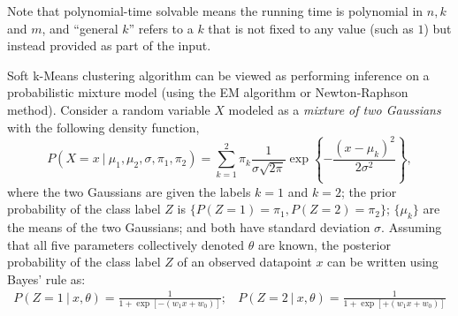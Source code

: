 \documentclass[solution,addpoints,12pt]{exam}
\begin{document}
\begin{questions}
Note that polynomial-time solvable means the running time is polynomial in $n, k$ and $m$, and ``general $k$'' refers to a $k$ that is not fixed to any value (such as $1$) but instead provided as part of the input. 

Soft k-Means clustering algorithm can be viewed as performing inference on a probabilistic mixture model (using the EM algorithm or Newton-Raphson method). Consider a random variable $X$ modeled as a {\em mixture of two Gaussians} with the following density function,  
\[
P(X=x ~|~ \mu_1, \mu_2, \sigma, \pi_1, \pi_2) = \sum_{k=1}^2 \pi_k \frac{1}{\sigma\sqrt{2\pi}} \exp \left\{ -\frac{(x-\mu_k)^2}{2\sigma^2} \right\}, 
\]
where the two Gaussians are given the labels $k=1$ and $k=2$; the prior probability of the class label $Z$ is $\{P(Z=1)=\pi_1, P(Z=2)=\pi_2\}$; $\{\mu_k\}$ are the means of the two Gaussians; and both have standard deviation $\sigma$. Assuming that all five parameters collectively denoted $\theta$ are known, the posterior probability of the class label $Z$ of an observed datapoint $x$ can be written using Bayes' rule as: 
\begin{eqnarray*}
P(Z=1 ~|~ x, \theta) = \frac{1}{1 + \exp[-(w_1 x + w_0)]};~~~~ 
P(Z=2 ~|~ x, \theta) = \frac{1}{1 + \exp[+(w_1 x + w_0)]}
\end{eqnarray*}
\begin{parts}

\end{parts}
\end{questions}
\end{document}
